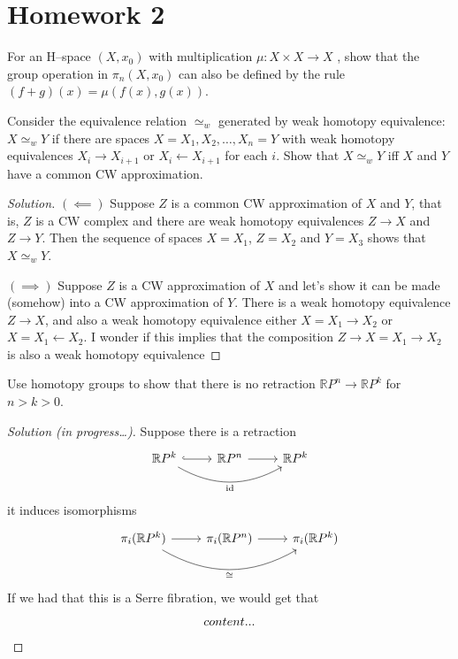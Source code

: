 \documentclass{article}
\numberwithin{equation}{section}
\newcommand{\R}{\mathbb{R}}
\DeclareMathOperator{\id}{id}
\begin{document}
\section{Homework 2}
\begin{exercise}[4.1.3]
	For an H–space $(X , x_0 )$ with multiplication $\mu : X \times X \to X$ , show that the group operation in $\pi_n(X,x_0)$ can also be defined by the rule $(f + g)(x) = \mu(f(x),g(x))$.
\end{exercise}
\begin{exercise}[4.1.19]
	Consider the equivalence relation $\simeq_w$ generated by weak homotopy equivalence: $X \simeq_w Y$ if there are spaces $X = X_1, X_2,\ldots, X_n = Y$ with weak homotopy equivalences $X_i\to X_{i+1}$ or $X_i\leftarrow X_{i+1}$ for each $i$. Show that $X\simeq_w Y$ iff $X$ and $Y$ have a common CW approximation.
\end{exercise}
\begin{proof}[Solution]
	$(\impliedby)$ Suppose $Z$ is a common CW approximation of $X$ and $Y$, that is, $Z$ is a CW complex and there are weak homotopy equivalences $Z\to X$ and $Z\to Y$. Then the sequence of spaces $X=X_1$, $Z=X_2$ and $Y=X_3$ shows that $X\simeq_wY$.
	
	$(\implies)$ Suppose $Z$ is a CW approximation of $X$ and let's show it can be made (somehow) into a CW approximation of $Y$. There is a weak homotopy equivalence $Z\to X$, and also a weak homotopy equivalence either $X=X_1\to X_2$ or $X=X_1\leftarrow X_2$. I wonder if this implies that the composition $Z\to X=X_1\to X_2$ is also a weak homotopy equivalence
\end{proof}

\begin{exercise}[4.2.1]
	Use homotopy groups to show that there is no retraction $\R P^n\to \R P^k$ for $n>k>0$.
\end{exercise}
\begin{proof}[Solution (in progress…)]
	Suppose there is a retraction
	\[\begin{tikzcd}
		\R P^k\arrow[r,hook]\arrow[rr,bend right,swap,"\id"]&\R P^n\arrow[r]&\R P^k
	\end{tikzcd}\]
	it induces isomorphisms
	\[\begin{tikzcd}
		\pi_i(\R P^k)\arrow[r]\arrow[rr,bend right,swap,"\cong"]&\pi_i(\R P^n)\arrow[r]&\pi_i(\R P^k)
	\end{tikzcd}\]
	If we had that this is a Serre fibration, we would get that
	\[\begin{tikzcd}
		content...
	\end{tikzcd}\]
\end{proof}
\end{document}
